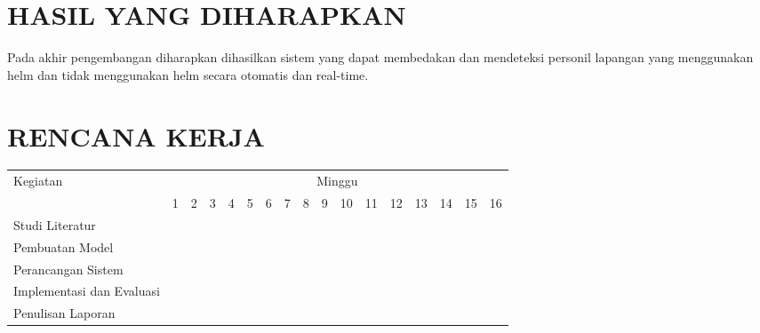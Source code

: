 \section{HASIL YANG DIHARAPKAN}

Pada akhir pengembangan diharapkan dihasilkan sistem yang dapat membedakan dan mendeteksi personil lapangan yang menggunakan helm dan tidak menggunakan helm secara otomatis dan real-time.

\section{RENCANA KERJA}

\newcommand{\w}{}
\newcommand{\G}{\cellcolor{gray}}
\begin{table}[h!]
  \begin{tabular}{|p{3.5cm}|c|c|c|c|c|c|c|c|c|c|c|c|c|c|c|c|}

    \hline
    \multirow{2}{*}{Kegiatan} & \multicolumn{16}{|c|}{Minggu} \\
    \cline{2-17} &
    1 & 2 & 3 & 4 & 5 & 6 & 7 & 8 & 9 & 10 & 11 & 12 & 13 & 14 & 15 & 16 \\
    \hline

    Studi Literatur &
    \G & \G & \G & \G & \G & \w & \w & \w & \w & \w & \w & \w & \w & \w & \w & \w \\
    \hline

    Pembuatan Model &
    \w & \w & \w & \G & \G & \G & \G & \G & \w & \w & \w & \w & \w & \w & \w & \w \\
    \hline

    Perancangan Sistem &
    \w & \w & \w & \w & \w & \w & \G & \G & \G & \G & \G & \w & \w & \w & \w & \w \\
    \hline

    Implementasi dan Evaluasi &
    \w & \w & \w & \w & \w & \w & \w & \w & \w & \w & \w & \G & \w & \w & \w & \w \\
    \hline
    
    Penulisan Laporan &
    \w & \w & \w & \w & \w & \w & \w & \w & \w & \w & \w & \w & \G & \G & \G & \G \\
    \hline

  \end{tabular}
\end{table}